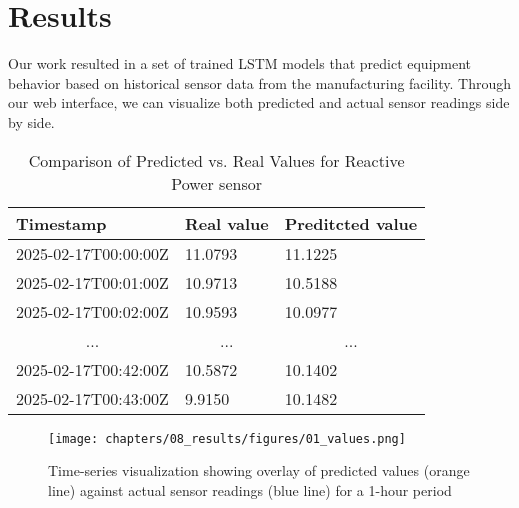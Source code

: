 \chapter{Results}
\label{chap:results}
\setlength{\parskip}{1em}

Our work resulted in a set of trained LSTM models that predict equipment behavior based on historical sensor data from the manufacturing facility. Through our web interface, we can visualize both predicted and actual sensor readings side by side. 

\begin{table}[]
    \centering
    \begin{tabular}{|l|l|l|}
    \hline
    Timestamp                 & Real value               & Preditcted value         \\ \hline
    2025-02-17T00:00:00Z      & 11.0793                  & 11.1225                  \\ \hline
    2025-02-17T00:01:00Z      & 10.9713                  & 10.5188                  \\ \hline
    2025-02-17T00:02:00Z      & 10.9593                  & 10.0977                  \\ \hline
    \multicolumn{1}{|c|}{...} & \multicolumn{1}{c|}{...} & \multicolumn{1}{c|}{...} \\ \hline
    2025-02-17T00:42:00Z      & 10.5872                  & 10.1402                  \\ \hline
    2025-02-17T00:43:00Z      & 9.9150                   & 10.1482                  \\ \hline
    \end{tabular}
    \caption{Comparison of Predicted vs. Real Values for Reactive Power sensor}
\end{table}

\begin{figure}[H]
    \centering
    \texttt{[image: chapters/08\_results/figures/01\_values.png]}
    \caption{Time-series visualization showing overlay of predicted values (orange line) against actual sensor readings (blue line) for a 1-hour period}
\end{figure}